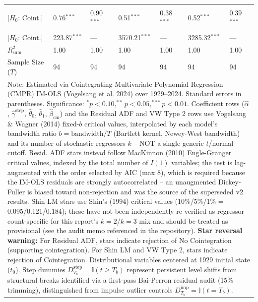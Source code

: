 \begin{table}[H]
\begin{tabular}{p{3.8cm}p{1.35cm}p{1.35cm}p{1.35cm}p{1.35cm}p{1.35cm}p{1.35cm}}
\makecell[l]{Shin LM ($C_{\text{Shin}}$) \\ {\scriptsize [$H_0$: Coint.]}} & 0.76$^{***}$ & 0.90$^{***}$ & 0.51$^{***}$ & 0.38$^{***}$ & 0.52$^{***}$ & 0.39$^{***}$  \\
\makecell[l]{VW Type 2 ($S_{\text{Type 2}}$) \\ {\scriptsize [$H_0$: Coint.]}} & 223.87$^{***}$ & --- & 3570.21$^{***}$ & --- & 3285.32$^{***}$ & ---  \\
\midrule
$R^2_{\text{sum}}$ & 1.00 & 1.00 & 1.00 & 1.00 & 1.00 & 1.00  \\
Sample Size ($T$) & 94 & 94 & 94 & 94 & 94 & 94  \\
\bottomrule
\multicolumn{7}{p{13.2cm}}{\footnotesize Note: Estimated via Cointegrating Multivariate Polynomial Regression (CMPR) IM-OLS (Vogelsang et al. 2024) over 1929--2024. Standard errors in parentheses. Significance: $^*p<0.10, ^{**}p<0.05, ^{***}p<0.01$. Coefficient rows ($\hat{\alpha}$, $\hat{\gamma}^{\text{step}}$, $\hat{\theta}_0$, $\hat{\theta}_1$, $\hat{\beta}_{\text{cm}}$) and the Residual ADF and VW Type 2 rows use Vogelsang \& Wagner (2014) fixed-$b$ critical values, interpolated by each model's bandwidth ratio $b=\text{bandwidth}/T$ (Bartlett kernel, Newey-West bandwidth) and its number of stochastic regressors $k$ -- NOT a single generic $t$/normal cutoff. Resid. ADF stars instead follow MacKinnon (2010) Engle-Granger critical values, indexed by the total number of $I(1)$ variables; the test is lag-augmented with the order selected by AIC (max 8), which is required because the IM-OLS residuals are strongly autocorrelated -- an unaugmented Dickey-Fuller is biased toward non-rejection and was the source of the superseded v2 results. Shin LM stars use Shin's (1994) critical values (10\%/5\%/1\% = 0.095/0.121/0.184); these have not been independently re-verified as regressor-count-specific for this report's $k=2$/$k=3$ mix and should be treated as provisional (see the audit memo referenced in the repository). \textbf{Star reversal warning:} For Residual ADF, stars indicate rejection of No Cointegration (supporting cointegration). For Shin LM and VW Type 2, stars indicate rejection of Cointegration. Distributional variables centered at 1929 initial state ($t_0$). Step dummies $D^{\text{step}}_{T_b} = \mathbb{I}(t \ge T_b)$ represent persistent level shifts from structural breaks identified via a first-pass Bai-Perron residual audit (15\% trimming), distinguished from impulse outlier controls $D^{\text{imp}}_{T_b} = \mathbb{I}(t = T_b)$.}
\end{tabular}
\end{table}
